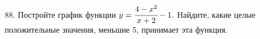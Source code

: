 88. Постройте график функции $y=\cfrac{4-x^2}{x+2}-1.$ Найдите, какие целые положительные значения, меньшие 5, принимает эта функция.\\
